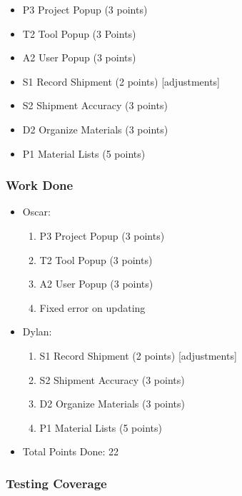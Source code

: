 \documentclass{article}
\begin{document}
\begin{itemize}
    \item P3 Project Popup (3 points)
    \item T2 Tool Popup (3 Points) 
    \item A2 User Popup (3 points)
    \item S1 Record Shipment (2 points) [adjustments]
    \item S2 Shipment Accuracy (3 points)
    \item D2 Organize Materials (3 points)
    \item P1 Material Lists (5 points)
\end{itemize}

\subsubsection{Work Done}

\begin{itemize}
    \item Oscar:
        \begin{enumerate}
            \item P3 Project Popup (3 points)
            \item T2 Tool Popup (3 points)
            \item A2 User Popup (3 points)
            \item Fixed error on updating
        \end{enumerate}

    \item Dylan:
        \begin{enumerate}
            \item S1 Record Shipment (2 points) [adjustments]
            \item S2 Shipment Accuracy (3 points)
            \item D2 Organize Materials (3 points)
            \item P1 Material Lists (5 points)
                
        \end{enumerate}

    \item Total Points Done: 22 
\end{itemize}


\subsubsection{Testing Coverage}
\end{document}
